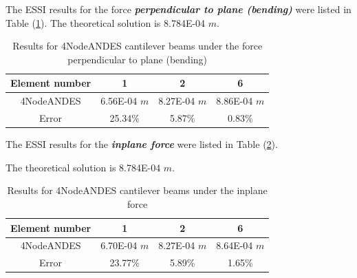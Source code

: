 \documentclass[fleqn,11pt]{article}
\begin{document}




The ESSI results for the force \textbf{\emph{perpendicular to plane (bending)}} were listed in Table (\ref{table 4NodeANDES cantilever beams results for different element number}). 
The theoretical solution is 8.784E-04 $m$.
\begin{table}[H]
  \centering
    \captionsetup{justification=centering,margin=2cm}
      \caption{Results for 4NodeANDES cantilever beams under the force perpendicular to plane (bending)}
    \label{table 4NodeANDES cantilever beams results for different element number}
    \begin{tabular}{|c|c|c|c|}
      \hline
      Element number & 1        & 2        & 6         \\  \hline
      4NodeANDES     & 6.56E-04 $m$ & 8.27E-04 $m$ & 8.86E-04 $m$     \\ \hline
      Error          & 25.34\% & 5.87\% & 0.83\%    \\ 
      \hline 
    \end{tabular}
\end{table}
The ESSI results for the \textbf{\emph{inplane force}} were listed in Table (\ref{table 4NodeANDES cantilever beams results for different element number 2}). 

The theoretical solution is 8.784E-04 $m$.


\begin{table}[H]
  \centering
      \captionsetup{justification=centering,margin=2cm}
      \caption{Results for 4NodeANDES cantilever beams under the inplane force}
    \label{table 4NodeANDES cantilever beams results for different element number 2}
    \begin{tabular}{|c|c|c|c|}
      \hline
      Element number & 1        & 2        & 6         \\  \hline
      4NodeANDES     &6.70E-04 $m$& 8.27E-04 $m$& 8.64E-04 $m$     \\ \hline
      Error          &  23.77\% & 5.89\% & 1.65\%          \\ 
      \hline 
    \end{tabular}
\end{table}

\end{document}
